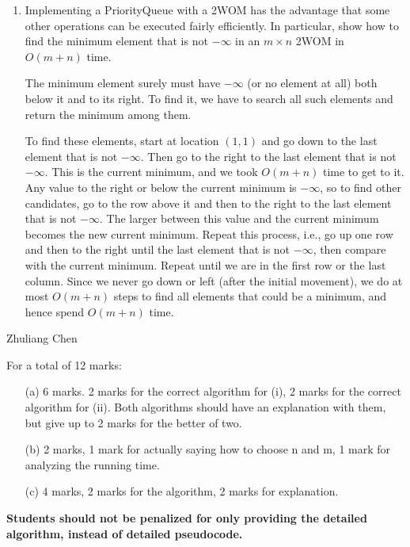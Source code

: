 \begin{enumerate}

\item
Implementing a PriorityQueue with a 2WOM has the advantage that some
other operations can be executed fairly efficiently.  In particular,
show how to find the minimum element that is not $-\infty$
    in an $m\times n$ 2WOM in $O(m+n)$ time.

\begin{solution}
The minimum element surely must have $-\infty$ (or no element at all) both
below it and to its right.  To find it, we have to search all such elements
and return the minimum among them.

To find these elements, start at location $(1,1)$ and go down to the last
element that is not
$-\infty$.  Then go to the right to the last element that is not
$-\infty$.  This is the current minimum, and we took $O(m+n)$ time to
get to it.  Any value to the right or below the current minimum is $-\infty$,
so to find other candidates, go to the row
above it and then to the right to the last element that is not $-\infty$.
The larger between this value and the current minimum becomes the new
current minimum.  Repeat this process, i.e., go up one row and then to the
right until the last element that is not $-\infty$, then compare with
the current minimum.  Repeat until we are in the first row or the last
column.  Since we never go down or left (after the initial
movement), we do at most $O(m+n)$ steps to find all elements that could be
a minimum, and hence spend $O(m+n)$ time.
\end{solution}



\end{enumerate}


\begin{suggestedMarkingScheme}
\begin{authorship}
Zhuliang Chen
\end{authorship}
For a total of 12 marks:
\begin{itemize}
  \item[(a)] 6 marks. 2 marks for the correct algorithm for (i), 2 marks for
       the correct algorithm for (ii). Both algorithms should have
       an explanation with them, but give up to 2 marks for the better
       of two.
  \item[(b)] 2 marks, 1 mark for actually saying how to choose n and m, 1
       mark for analyzing the running time.
  \item[(c)] 4 marks, 2 marks for the algorithm, 2 marks for explanation.
\end{itemize}
\textbf{ Students should not be penalized for only providing the
detailed algorithm, instead of detailed pseudocode.}
\end{suggestedMarkingScheme}
